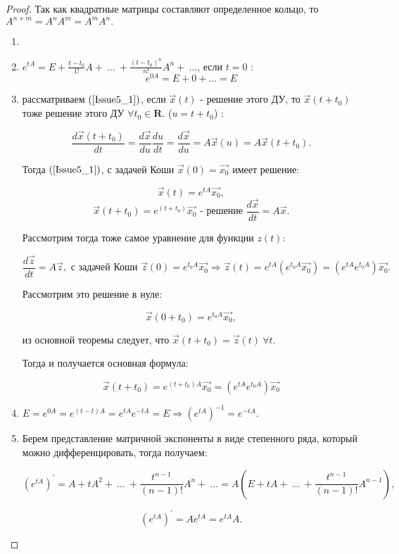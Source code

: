 \begin{proof}

Так как квадратные матрицы составляют определенное кольцо, то \\
$A^{n+m} = A^nA^m=A^mA^n.$

\begin{enumerate}

\item

\item $ e^{tA} = E + \frac{t-t_0}{1!}A +\ \dots\ + \frac{(t-t_0)^n}{n!}A^n+\ \dots $, если $t = 0$ :
\[ e^{0A} = E + 0 + \dots = E\]

\item рассматриваем $(\ref{Issue5_1})$, если $\vec{x}(t)$ - решение этого ДУ, то $\vec{x}(t+t_0)$ тоже решение этого ДУ $\forall t_0 \in \mathbf{R}$. ($u = t + t_0$) :

\[ \frac{d\vec{x}(t+t_0)}{dt} = \frac{d\vec{x}}{du}\frac{du}{dt} = \frac{d\vec{x}}{du} = A\vec{x}(u) = A\vec{x}(t+t_0).\]

Тогда $(\ref{Issue5_1})$, с задачей Коши $\vec{x}(0) = \vec{x_0}$ имеет решение:

\[ \vec{x}(t) =  e^{tA}\vec{x_0},\]
\[ \vec{x}(t+t_0) = e^{(t+t_0)}\vec{x_0}\text{ - решение }\frac{d\vec{x}}{dt} = A\vec{x}. \]

Рассмотрим тогда тоже самое уравнение для функции $z(t)$:

\[ \frac{d\vec{z}}{dt} = A\vec{z}, \text{ с задачей Коши } \vec{z}(0) = e^{t_0A}\vec{x_0} \Rightarrow \vec{z}(t) = e^{tA} (e^{t_0A}\vec{x_0}) = (e^{tA}e^{t_0A})\vec{x_0}.\]

Рассмотрим это решение в нуле:

\[ \vec{x}(0 + t_0) = e^{t_0A}\vec{x_0},\]

из основной теоремы следует, что $\vec{x}(t+t_0) = \vec{z}(t)\ \forall t$.

Тогда и получается основная формула:

\[ \vec{x}(t+t_0) = e^{(t+t_0)A}\vec{x_0} = (e^{tA}e^{t_0A})\vec{x_0}\]

\item $E = e^{0A} = e^{(t-t)A} = e^{tA}e^{-tA} = E \Rightarrow \left(e^{tA}\right)^{-1} = e^{-tA}.$

\item Берем представление матричной экспоненты в виде степенного ряда, который можно дифференцировать, тогда получаем:

\[ (e^{tA})^{'} = A + tA^2 +\ \dots\ +\frac{t^{n-1}}{(n-1)!} A^n +\ \dots = A\left(E + tA +\ \dots\ + \frac{t^{n-1}}{(n-1)!}A^{n-1}\right),\]

\[ (e^{tA})^{'} = Ae^{tA} = e^{tA}A.\]

\end{enumerate}

\end{proof}

